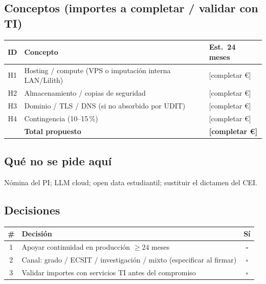 \documentclass[11pt,a4paper]{scrartcl}
\begin{document}
\subsection*{Conceptos (importes a completar / validar con TI)}
\renewcommand{\arraystretch}{1.25}
\begin{tabularx}{\textwidth}{@{}c>{\raggedright\arraybackslash}X>{\raggedright\arraybackslash}p{3.6cm}@{}}
  \toprule
  \textbf{ID} & \textbf{Concepto} & \textbf{Est.~24 meses} \\
  \midrule
  H1 & Hosting / compute (VPS o imputación interna LAN/Lilith) & {[}completar €{]} \\
  H2 & Almacenamiento / copias de seguridad & {[}completar €{]} \\
  H3 & Dominio / TLS / DNS (si no absorbido por UDIT) & {[}completar €{]} \\
  H4 & Contingencia (10--15\,\%) & {[}completar €{]} \\
  \midrule
  & \textbf{Total propuesto} & \textbf{{[}completar €{]}} \\
  \bottomrule
\end{tabularx}

\vspace{0.35em}

\subsection*{Qué no se pide aquí}
Nómina del PI; LLM cloud; open data estudiantil; sustituir el dictamen del CEI.

\subsection*{Decisiones}
\renewcommand{\arraystretch}{1.3}
\begin{tabularx}{\textwidth}{@{}c>{\raggedright\arraybackslash}X c@{}}
  \toprule
  \textbf{\#} & \textbf{Decisión} & \textbf{Sí} \\
  \midrule
  1 & Apoyar continuidad en producción $\geq 24$ meses & $\square$ \\
  2 & Canal: grado / ECSIT / investigación / mixto (especificar al firmar) & $\square$ \\
  3 & Validar importes con servicios TI antes del compromiso & $\square$ \\
  \bottomrule
\end{tabularx}
\end{document}
